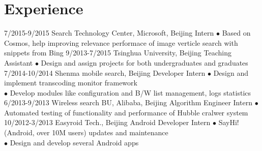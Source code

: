 \documentclass[]{friggeri-cv}
\begin{document}
\section{Experience}

\begin{entrylist}
  \entry
    {7/2015-9/2015}
    {Search Technology Center, Microsoft, Beijing}
    {Intern}
    {$\bullet$ Based on Cosmos, help improving relevance performace of image verticle search with snippets from Bing}
  \entry
    {9/2013-7/2015}
    {Tsinghua University, Beijing}
    {Teaching Assistant}
    {$\bullet$ Design and assign projects for both undergraduates and graduates}
  \entry
    {7/2014-10/2014}
    {Shenma mobile search, Beijing}
    {Developer Intern}
    {$\bullet$ Design and implement transcoding monitor framework\\
    $\bullet$ Develop modules like configuration and B/W list management, logs statistics}
  \entry
    {6/2013-9/2013}
    {Wireless search BU, Alibaba, Beijing}
    {Algorithm Engineer Intern}
    {$\bullet$ Automated testing of functionality and performance of Hubble cralwer system}
  \entry
    {10/2012-3/2013}
    {Easyroid Tech., Beijing}
    {Android Developer Intern}
    {$\bullet$ SayHi!(Android, over 10M users) updates and maintenance\\
    $\bullet$ Design and develop several Android apps}
\end{entrylist}
\end{document}
